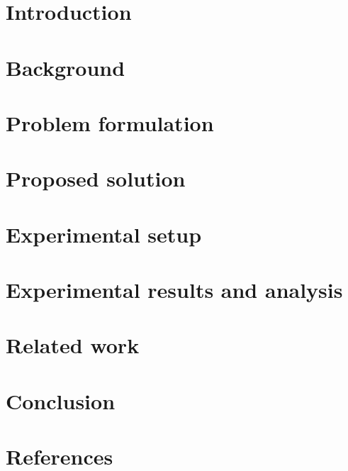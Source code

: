 \documentclass[review]{elsarticle}
\begin{document}

\section{Introduction} \label{sec:introduction}


\section{Background}\label{sec:background}


\section{Problem formulation}\label{sec:problem}


\section{Proposed solution}\label{sec:methods}
%

\section{Experimental setup}\label{sec:experimental_setup}
%

\section{Experimental results and analysis}\label{sec:experimental_result}
%

\section{Related work}\label{sec:rw}
%

\section{Conclusion} \label{sec:conclusions}
%

\section*{References}


\end{document}
